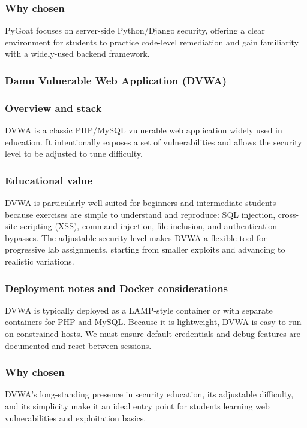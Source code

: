 \documentclass[12pt]{article}
\begin{document}
\subsubsection*{Why chosen}
PyGoat focuses on server-side Python/Django security, offering a clear environment for students to practice code-level remediation and gain familiarity with a widely-used backend framework.


\subsubsection{Damn Vulnerable Web Application (DVWA)}
\subsubsection*{Overview and stack}
DVWA is a classic PHP/MySQL vulnerable web application widely used in education. It intentionally exposes a set of vulnerabilities and allows the security level to be adjusted to tune difficulty.

\subsubsection*{Educational value}
DVWA is particularly well-suited for beginners and intermediate students because exercises are simple to understand and reproduce: SQL injection, cross-site scripting (XSS), command injection, file inclusion, and authentication bypasses. The adjustable security level makes DVWA a flexible tool for progressive lab assignments, starting from smaller exploits and advancing to realistic variations.

\subsubsection*{Deployment notes and Docker considerations}
DVWA is typically deployed as a LAMP-style container or with separate containers for PHP and MySQL. Because it is lightweight, DVWA is easy to run on constrained hosts. We must ensure default credentials and debug features are documented and reset between sessions.

\subsubsection*{Why chosen}
DVWA’s long-standing presence in security education, its adjustable difficulty, and its simplicity make it an ideal entry point for students learning web vulnerabilities and exploitation basics.
\end{document}
